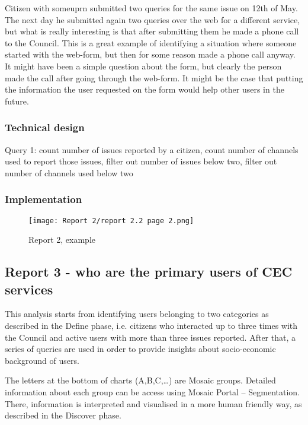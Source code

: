 Citizen with some\textunderscore uprn submitted two queries for the same issue on 12th of May. The next day he submitted again two queries over the web for a different service, but what is really interesting is that after submitting them he made a phone call to the Council. This is a great example of identifying a situation where someone started with the web-form, but then for some reason made a phone call anyway. It might have been a simple question about the form, but clearly the person made the call after going through the web-form. It might be the case that putting the information the user requested on the form would help other users in the future.
		
			\subsubsection{Technical design}
			
Query 1: count number of issues reported by a citizen, count number of channels used to report those issues, filter out number of issues below two, filter out number of channels used below two
			
			\subsubsection{Implementation}

\begin{figure}[hp]
\centering
     \texttt{[image: Report 2/report 2.2 page 2.png]}
      \caption{Report 2, example}
\end{figure}
			
		\subsection{Report 3 - who are the primary users of CEC services}
		
This analysis starts from identifying users belonging to two categories as described in the Define phase, i.e. citizens who interacted up to three times with the Council and active users with more than three issues reported. After that, a series of queries are used in order to provide insights about socio-economic background of users.

The letters at the bottom of charts (A,B,C,…) are Mosaic groups. Detailed information about each group can be access using Mosaic Portal – Segmentation. There, information is interpreted and visualised in a more human friendly way, as described in the Discover phase.

